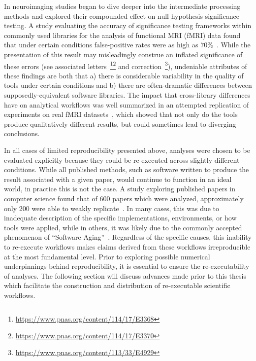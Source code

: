 In neuroimaging studies began to dive deeper into the intermediate processing methods and explored their compounded
effect on null hypothesis significance testing. A study evaluating the accuracy of significance testing frameworks within
commonly used libraries for the analysis of functional MRI (fMRI) data found that under certain conditions false-positive
rates were as high as $70\%$~\cite{eklund2016cluster}. While the presentation of this result may misleadingly construe an
inflated significance of these errors (see associated
letters~\footnote{\url{https://www.pnas.org/content/114/17/E3368}}\footnote{\url{https://www.pnas.org/content/114/17/E3370}}
and correction~\footnote{\url{https://www.pnas.org/content/113/33/E4929}}), undeniable attributes of these findings are
both that a) there is considerable variability in the quality of tools under certain conditions and b) there are
often-dramatic differences between supposedly-equivalent software libraries. The impact that cross-library differences have
on analytical workflows was well summarized in an attempted replication of experiments on real fMRI
datasets~\cite{bowring2019exploring}, which showed that not only do the tools produce qualitatively different results,
but could sometimes lead to diverging conclusions.

In all cases of limited reproducibility presented above, analyses were chosen to be evaluated explicitly because they
could be re-executed across slightly different conditions. While all published methods, such as software written to
produce the result associated with a given paper, would continue to function in an ideal world, in practice this is not
the case. A study exploring published papers in computer science found that of $600$ papers which were analyzed,
approximately only $200$ were able to weakly replicate~\cite{collberg2016repeatability}. In many cases, this was due to
inadequate description of the specific implementations, environments, or how tools were applied, while in others, it was
likely due to the commonly accepted phenomenon of ``Software Aging''~\cite{parnas1994software}. Regardless of the specific
causes, this inability to re-execute workflows makes claims derived from these workflows irreproducible at the most
fundamental level. Prior to exploring possible numerical underpinnings behind reproducibility, it is essential to ensure
the re-executability of analyses. The following section will discuss advances made prior to this thesis which facilitate
the construction and distribution of re-executable scientific workflows.

